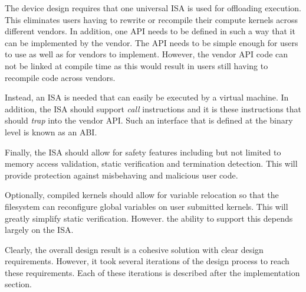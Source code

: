 The device design requires that one universal ISA is used for offloading
execution. This eliminates users having to rewrite or recompile their compute
kernels across different vendors. In addition, one API needs to be defined in
such a way that it can be implemented by the vendor. The API needs to be
simple enough for users to use as well as for vendors to implement. However, the
vendor API code can not be linked at compile time as this would result in users
still having to recompile code across vendors.

Instead, an ISA is needed that can easily be executed by a virtual machine. In
addition, the ISA should support \textit{call} instructions and it is these
instructions that should \textit{trap} into the vendor API. Such an interface
that is defined at the binary level is known as an ABI.

Finally, the ISA should allow for safety features including but not limited to 
memory access validation, static verification and termination detection.
This will provide protection against misbehaving and malicious user code.

Optionally, compiled kernels should allow for variable relocation so that the
filesystem can reconfigure global variables on user submitted kernels. This
will greatly simplify static verification. However. the ability to support this
depends largely on the ISA.

Clearly, the overall design result is a cohesive solution with clear design
requirements. However, it took several iterations of the design process to
reach these requirements. Each of these iterations is described after the
implementation section.

